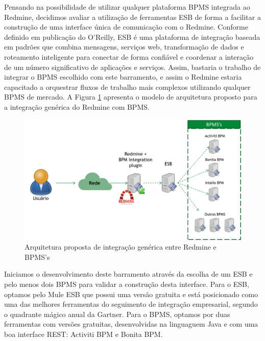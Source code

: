  Pensando na possibilidade de utilizar qualquer plataforma BPMS integrada ao Redmine, decidimos avaliar a utilização de ferramentas ESB\cite{esb} de forma a facilitar a construção de uma interface única de comunicação com o Redmine. Conforme definido em publicação do O'Reilly\cite{oreilly_esb}, ESB é uma plataforma de integração baseada em padrões que combina mensagens, serviços web, transformação de dados e roteamento inteligente para conectar de forma confiável e coordenar a interação de um número significativo de aplicações e serviços. Assim, bastaria o trabalho de integrar o BPMS escolhido com este barramento, e assim o Redmine estaria capacitado a orquestrar fluxos de trabalho mais complexos utilizando qualquer BPMS de mercado. A Figura \ref{fig:arquitetura_integracao_generica_redmine_bpm}  apresenta o modelo de arquitetura proposto para a integração genérica do Redmine com BPMS.

\begin{figure}[H]
\centering
\includegraphics[width=1\textwidth]{imagens/arquitetura_proposta_inicialmente_bpm_integration.png}
\caption{Arquitetura proposta de integração genérica entre Redmine e BPMS's}
\label{fig:arquitetura_integracao_generica_redmine_bpm}
\end{figure}

Iniciamos o desenvolvimento deste barramento através da escolha de um ESB e pelo menos dois BPMS para validar a construção desta interface. Para o ESB, optamos pelo Mule ESB\cite{mule} que possui uma versão gratuita e está posicionado como uma das melhores ferramentas do seguimento de integração empresarial, segundo o quadrante mágico anual da Gartner\cite{mule_gartner}. Para o BPMS, optamos por duas ferramentas com versões gratuitas, desenvolvidas na linguaguem Java e com uma boa interface REST\cite{rest}: Activiti BPM\cite{bpm_activiti} e Bonita BPM\cite{bpm_bonita}.

